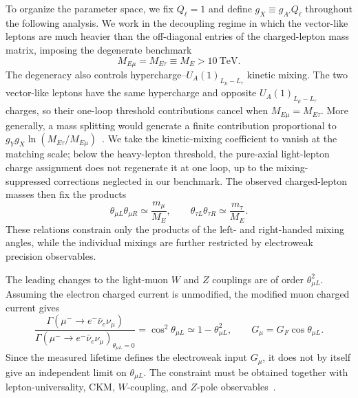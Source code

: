 \documentclass[onecolumn, aps, nofootinbib, prd, preprint, floats, floatfix, amsmath, amssymb, superscriptaddress, preprintnumbers]{revtex4-2}
\begin{document}
To organize the parameter space, we fix $Q_\ell=1$ and define $g_X\equiv g_{A'}Q_\ell$ throughout the following analysis. We work in the decoupling regime in which the vector-like leptons are much heavier than the off-diagonal entries of the charged-lepton mass matrix, imposing the degenerate benchmark
\begin{equation}
M_{E\mu}=M_{E\tau}\equiv M_E>10~\mathrm{TeV}.
\end{equation}
The degeneracy also controls hypercharge--$U_A(1)_{L_\mu-L_\tau}$ kinetic mixing. The two vector-like leptons have the same hypercharge and opposite $U_A(1)_{L_\mu-L_\tau}$ charges, so their one-loop threshold contributions cancel when $M_{E\mu}=M_{E\tau}$. More generally, a mass splitting would generate a finite contribution proportional to $g_Yg_X\ln(M_{E\tau}/M_{E\mu})$~\cite{Holdom:1985ag}. We take the kinetic-mixing coefficient to vanish at the matching scale; below the heavy-lepton threshold, the pure-axial light-lepton charge assignment does not regenerate it at one loop, up to the mixing-suppressed corrections neglected in our benchmark.
The observed charged-lepton masses then fix the products
\begin{equation}
\theta_{\mu L}\theta_{\mu R}\simeq\frac{m_\mu}{M_E},
\qquad
\theta_{\tau L}\theta_{\tau R}\simeq\frac{m_\tau}{M_E}.
\end{equation}
These relations constrain only the products of the left- and right-handed mixing angles, while the individual mixings are further restricted by electroweak precision observables.

The leading changes to the light-muon $W$ and $Z$ couplings are of order $\theta_{\mu L}^2$. Assuming the electron charged current is unmodified, the modified muon charged current gives
\begin{equation}
\frac{\Gamma(\mu^-\to e^-\bar\nu_e\nu_\mu)}
{\Gamma(\mu^-\to e^-\bar\nu_e\nu_\mu)_{\theta_{\mu L}=0}}
=\cos^2\theta_{\mu L}
\simeq1-\theta_{\mu L}^2,
\qquad G_\mu=G_F\cos\theta_{\mu L}.
\label{eq:muon-lifetime-mixing}
\end{equation}
Since the measured lifetime defines the electroweak input $G_\mu$, it does not by itself give an independent limit on $\theta_{\mu L}$. The constraint must be obtained together with lepton-universality, CKM, $W$-coupling, and $Z$-pole observables~\cite{ParticleDataGroup:2024cfk,ALEPH:2005ab,Crivellin:2020ebi,Poh:2017tfo}. 
\end{document}
